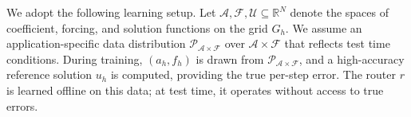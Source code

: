 \documentclass{article} %
\newcommand\ambuj[1]{\textcolor{red}{AT: #1}}
\begin{document}
We adopt the following learning setup. Let $\mathcal{A}, \mathcal{F}, \mathcal{U} \subseteq \mathbb{R}^N$ denote the spaces of coefficient, forcing, and solution functions on the grid $G_h$. We assume an application-specific data distribution $\mathcal{P}_{\mathcal{A} \times \mathcal{F}}$ over $\mathcal{A} \times \mathcal{F}$ that reflects test time conditions.
During training, $(a_h, f_h)$ is drawn from $\mathcal{P}_{\mathcal{A} \times \mathcal{F}}$, and a high-accuracy reference solution $u_h$ is computed, providing the true per-step error. The router $r$ is learned offline on this data; at test time, it operates without access to true errors.

\end{document}
